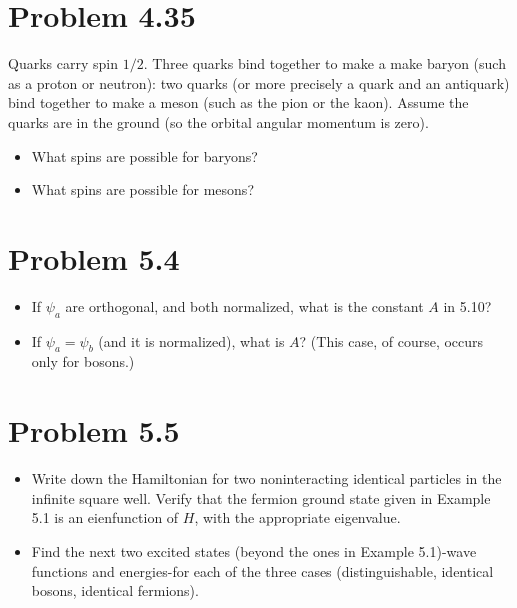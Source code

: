 \documentclass[../main.tex]{subfiles}
\begin{document}
\section{Problem 4.35}

Quarks carry spin $1/2$.
Three quarks bind together to make a make baryon (such as a proton or neutron): two quarks (or more precisely a quark and an antiquark) bind together to make a meson (such as the pion or the kaon).
Assume the quarks are in the ground (so the orbital angular momentum is zero).

\begin{itemize}
    \item What spins are possible for baryons?
    \item What spins are possible for mesons?
\end{itemize}

\section{Problem 5.4}

\begin{itemize}
    \item If $\psi_a$ are orthogonal, and both normalized, what is the constant $A$ in 5.10?
    \item If $\psi_a=\psi_b$ (and it is normalized), what is $A$? (This case, of course, occurs only for bosons.)
\end{itemize}

\section{Problem 5.5}

\begin{itemize}
    \item Write down the Hamiltonian for two noninteracting identical particles in the infinite square well.
        Verify that the fermion ground state given in Example 5.1 is an eienfunction of $H$, with the appropriate eigenvalue.
    \item Find the next two excited states (beyond the ones in Example 5.1)-wave functions and energies-for each of the three cases (distinguishable, identical bosons, identical fermions).
\end{itemize}
\end{document}
